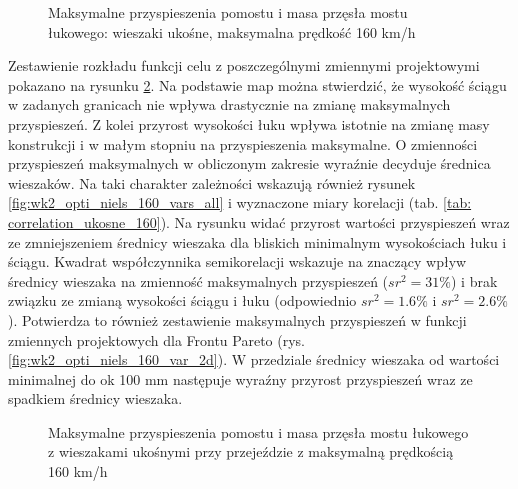 \begin{figure}[hbt!]
	\centering
	\captionsetup{justification=centering}
	\caption{Maksymalne przyspieszenia pomostu i masa przęsła mostu łukowego: wieszaki ukośne, maksymalna prędkość 160 km/h}
	\label{fig:wk2_opti_niels_160_all}
\end{figure}

Zestawienie rozkładu funkcji celu z poszczególnymi zmiennymi projektowymi pokazano na rysunku \ref{fig:wk2_opti_niels_160_variables}. Na podstawie map można stwierdzić, że wysokość ściągu w zadanych granicach nie wpływa drastycznie na zmianę maksymalnych przyspieszeń. Z kolei przyrost wysokości łuku wpływa istotnie na zmianę masy konstrukcji i w małym stopniu na przyspieszenia maksymalne. O zmienności przyspieszeń maksymalnych w obliczonym zakresie wyraźnie decyduje średnica wieszaków. Na taki charakter zależności wskazują również rysunek \ref{fig:wk2_opti_niels_160_vars_all} i wyznaczone miary korelacji (tab. \ref{tab: correlation_ukosne_160}). Na rysunku widać przyrost wartości przyspieszeń wraz ze zmniejszeniem średnicy wieszaka dla bliskich minimalnym wysokościach łuku i ściągu. Kwadrat współczynnika semikorelacji wskazuje na znaczący wpływ średnicy wieszaka na zmienność maksymalnych przyspieszeń ($sr^2=31\%$) i brak związku ze zmianą wysokości ściągu i łuku (odpowiednio $sr^2 = 1.6\%$ i $sr^2=2.6 \%$). Potwierdza to również zestawienie maksymalnych przyspieszeń w funkcji zmiennych projektowych dla Frontu Pareto (rys. \ref{fig:wk2_opti_niels_160_var_2d}). W przedziale średnicy wieszaka od wartości minimalnej do ok 100 mm następuje wyraźny przyrost przyspieszeń wraz ze spadkiem średnicy wieszaka.




\begin{figure}[hbt!]
	\centering
	\captionsetup{justification=centering}
	\caption{Maksymalne przyspieszenia pomostu i masa przęsła mostu łukowego z wieszakami ukośnymi przy przejeździe z maksymalną prędkością 160 km/h}
	\label{fig:wk2_opti_niels_160_variables}
\end{figure}

